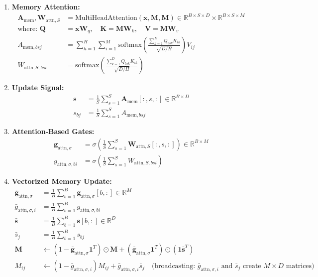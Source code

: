 \documentclass{article}
\begin{document}
\begin{enumerate}
\item \textbf{Memory Attention:}
\begin{align}
\mathbf{A}_{\text{mem}}, \mathbf{W}_{\text{attn},S} &= \text{MultiHeadAttention}(\mathbf{x}, \mathbf{M}, \mathbf{M}) \in \mathbb{R}^{B \times S \times D} \times \mathbb{R}^{B \times S \times M} \\
\text{where: } \mathbf{Q} &= \mathbf{x} \mathbf{W}_q, \quad \mathbf{K} = \mathbf{M} \mathbf{W}_k, \quad \mathbf{V} = \mathbf{M} \mathbf{W}_v \\
A_{\text{mem},bsj} &= \sum_{h=1}^{H} \sum_{i=1}^{M} \text{softmax}\left(\frac{\sum_{k=1}^{D} Q_{bsk} K_{ik}}{\sqrt{D/H}}\right) V_{ij} \\
W_{\text{attn},S,bsi} &= \text{softmax}\left(\frac{\sum_{k=1}^{D} Q_{bsk} K_{ik}}{\sqrt{D/H}}\right)
\end{align}

\item \textbf{Update Signal:}
\begin{align}
\mathbf{s} &= \frac{1}{S}\sum_{s=1}^{S} \mathbf{A}_{\text{mem}}[:, s, :] \in \mathbb{R}^{B \times D} \\
s_{bj} &= \frac{1}{S}\sum_{s=1}^{S} A_{\text{mem},bsj}
\end{align}

\item \textbf{Attention-Based Gates:}
\begin{align}
\mathbf{g}_{\text{attn},\sigma} &= \sigma\left(\frac{1}{S}\sum_{s=1}^{S} \mathbf{W}_{\text{attn},S}[:, s, :]\right) \in \mathbb{R}^{B \times M} \\
g_{\text{attn},\sigma,bi} &= \sigma\left(\frac{1}{S}\sum_{s=1}^{S} W_{\text{attn},S,bsi}\right)
\end{align}

\item \textbf{Vectorized Memory Update:}
\begin{align}
\bar{\mathbf{g}}_{\text{attn},\sigma} &= \frac{1}{B}\sum_{b=1}^{B} \mathbf{g}_{\text{attn},\sigma}[b, :] \in \mathbb{R}^{M} \\
\bar{g}_{\text{attn},\sigma,i} &= \frac{1}{B}\sum_{b=1}^{B} g_{\text{attn},\sigma,bi} \\
\bar{\mathbf{s}} &= \frac{1}{B}\sum_{b=1}^{B} \mathbf{s}[b, :] \in \mathbb{R}^{D} \\
\bar{s}_j &= \frac{1}{B}\sum_{b=1}^{B} s_{bj} \\
\mathbf{M} &\leftarrow (1 - \bar{\mathbf{g}}_{\text{attn},\sigma} \mathbf{1}^T) \odot \mathbf{M} + (\bar{\mathbf{g}}_{\text{attn},\sigma} \mathbf{1}^T) \odot (\mathbf{1} \bar{\mathbf{s}}^T) \\
M_{ij} &\leftarrow (1 - \bar{g}_{\text{attn},\sigma,i}) M_{ij} + \bar{g}_{\text{attn},\sigma,i} \bar{s}_j \quad \text{(broadcasting: $\bar{g}_{\text{attn},\sigma,i}$ and $\bar{s}_j$ create $M \times D$ matrices)}
\end{align}


\end{enumerate}
\end{document}
